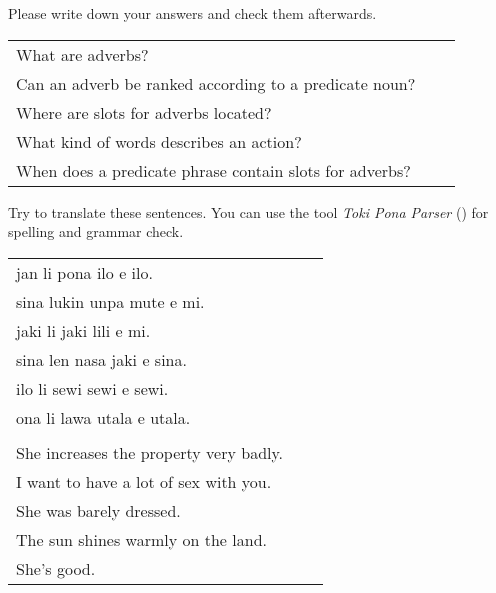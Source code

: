 Please write down your answers and check them afterwards. 

\begin{supertabular}{p{5,5cm}|ll}
What are adverbs? &&  \\ %
Can an adverb be ranked according to a predicate noun? &&   \\ %
Where are slots for adverbs located? &&  \\ %
What kind of words describes an action? &&  \\ %
When does a predicate phrase contain slots for adverbs? &&  \\ %
\end{supertabular}

Try to translate these sentences. 
You can use the tool \textit{Toki Pona Parser} (\cite{www:rowa:02}) for spelling and grammar check. 

\begin{supertabular}{p{5,5cm}|ll}
jan li pona ilo e ilo. &&   \\ %
sina lukin unpa mute e mi. &&    \\ %
jaki li jaki lili e mi. &&   \\ %
sina len nasa jaki e sina. &&   \\ %
ilo li sewi sewi e sewi. &&   \\ %
ona li lawa utala e utala. &&   \\ %
 && \\ %
She increases the property very badly. &&   \\
I want to have a lot of sex with you. &&   \\
She was barely dressed. &&   \\
The sun shines warmly on the land. &&   \\
She's good. &&  \\
\end{supertabular} 


